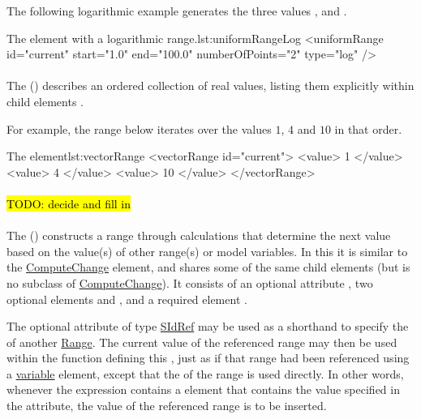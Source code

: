 The following logarithmic example generates the three values ,  and .
\begin{myXmlLst}{The  element with a logarithmic range.}{lst:uniformRangeLog}
<uniformRange id="current" start="1.0" end="100.0" numberOfPoints="2" type="log" />
\end{myXmlLst}

\paragraph{}
\label{class:vectorRange}

The  () describes an ordered collection of real values, listing them explicitly within child  elements .

For example, the range below iterates over the values $1$, $4$ and $10$ in that order.
\begin{myXmlLst}{The  element}{lst:vectorRange}
<vectorRange id="current"> 
	<value> 1 </value> 
	<value> 4 </value> 
	<value> 10 </value> 
</vectorRange> 
\end{myXmlLst}

\paragraph{}
\label{class:dataRange}
\hl{TODO: decide and fill in}

\paragraph{}
\label{class:functionalRange}
The  () constructs a range through calculations that determine the next value based on the value(s) of other range(s) or model variables. In this it is similar to the \hyperref[class:computeChange]{ComputeChange} element, and shares some of the same child elements (but is no subclass of \hyperref[class:computeChange]{ComputeChange}). It consists of an optional attribute , two optional elements \hyperref[sec:listOfVariables]{} and \hyperref[sec:listOfParameters]{}, and a required element \hyperref[sec:math]{}.

The optional attribute  of type \hyperref[type:sidref]{SIdRef} may be used as a shorthand to specify the \hyperref[sec:id]{} of another \hyperref[class:range]{Range}. The current value of the referenced range may then be used within the function defining this , just as if that range had been referenced using a \hyperref[class:variable]{variable} element, except that the \hyperref[sec:id]{} of the range is used directly. In other words, whenever the expression contains a  element that contains the value specified in the  attribute, the value of the referenced range is to be inserted.


